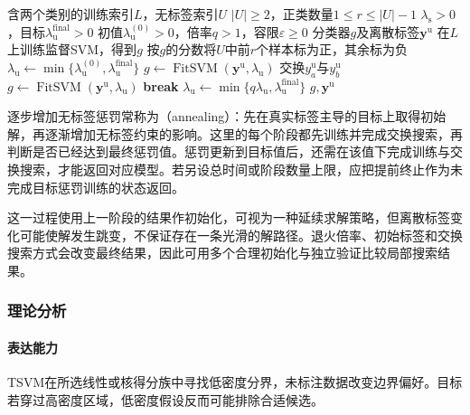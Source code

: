 \begin{algorithm}[固定类别数量的TSVM逐步加权]
  \label{alg:classification-tsvm}
  \begin{algorithmic}[1]
    \Require 含两个类别的训练索引$L$，无标签索引$U$
    \Require $|U|\geq2$，正类数量$1\leq r\leq|U|-1$
    \Require $\lambda_{\mathrm{s}}>0$，目标$\lambda_{\mathrm{u}}^{\mathrm{final}}>0$
    \Require 初值$\lambda_{\mathrm{u}}^{(0)}>0$，倍率$q>1$，容限$\varepsilon\geq0$
    \Ensure 分类器$g$及离散标签$\bm{y}^{\mathrm{u}}$
    \State 在$L$上训练监督SVM，得到$g$
    \State 按$g$的分数将$U$中前$r$个样本标为正，其余标为负
    \State $\lambda_{\mathrm{u}}\gets
      \min\{\lambda_{\mathrm{u}}^{(0)},\lambda_{\mathrm{u}}^{\mathrm{final}}\}$
      \State $g\gets\operatorname{FitSVM}(\bm{y}^{\mathrm{u}},\lambda_{\mathrm{u}})$
        \State 交换$y_a^{\mathrm{u}}$与$y_b^{\mathrm{u}}$
        \State $g\gets\operatorname{FitSVM}(\bm{y}^{\mathrm{u}},\lambda_{\mathrm{u}})$
      \EndWhile
        \State \textbf{break}
      \EndIf
      \State $\lambda_{\mathrm{u}}\gets
        \min\{q\lambda_{\mathrm{u}},\lambda_{\mathrm{u}}^{\mathrm{final}}\}$
    \EndWhile
    \State \Return $g,\bm{y}^{\mathrm{u}}$
  \end{algorithmic}
\end{algorithm}

逐步增加无标签惩罚常称为（annealing）：先在真实标签主导的目标上取得初始解，再逐渐增加无标签约束的影响。这里的每个阶段都先训练并完成交换搜索，再判断是否已经达到最终惩罚值。惩罚更新到目标值后，还需在该值下完成训练与交换搜索，才能返回对应模型。若另设总时间或阶段数量上限，应把提前终止作为未完成目标惩罚训练的状态返回。

这一过程使用上一阶段的结果作初始化，可视为一种延续求解策略，但离散标签变化可能使解发生跳变，不保证存在一条光滑的解路径。退火倍率、初始标签和交换搜索方式会改变最终结果，因此可用多个合理初始化与独立验证比较局部搜索结果。

\subsubsection{理论分析}
\label{sec:classification-tsvm-analysis}

\paragraph{表达能力}
TSVM在所选线性或核得分族中寻找低密度分界，未标注数据改变边界偏好。目标若穿过高密度区域，低密度假设反而可能排除合适候选。

